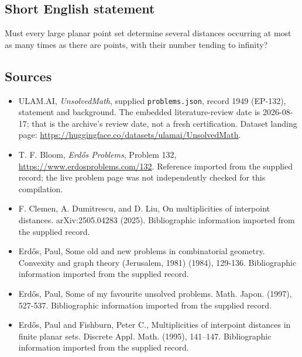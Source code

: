 \documentclass[11pt,a4paper]{article}
\begin{document}
\subsection{Short English statement}

Must every large planar point set determine several distances occurring at most as many times as there are points, with their number tending to infinity?

\subsection{Sources}

{\small

\begin{itemize}

\item[\hypertarget{source:1949:1}{S1}] ULAM.AI, \emph{UnsolvedMath}, supplied \texttt{problems.json}, record 1949 (EP-132), statement and background. The embedded literature-review date is 2026-08-17; that is the archive’s review date, not a fresh certification. Dataset landing page: \url{https://huggingface.co/datasets/ulamai/UnsolvedMath}.

\item[\hypertarget{source:1949:2}{S2}] T. F. Bloom, \emph{Erdős Problems}, Problem 132, \url{https://www.erdosproblems.com/132}. Reference imported from the supplied record; the live problem page was not independently checked for this compilation.

\item[\hypertarget{source:1949:3}{S3}] F. Clemen, A. Dumitrescu, and D. Liu, On multiplicities of interpoint distances. arXiv:2505.04283 (2025). Bibliographic information imported from the supplied record.

\item[\hypertarget{source:1949:4}{S4}] Erd\H{o}s, Paul, Some old and new problems in combinatorial geometry. Convexity and graph theory (Jerusalem, 1981) (1984), 129-136. Bibliographic information imported from the supplied record.

\item[\hypertarget{source:1949:5}{S5}] Erd\H{o}s, Paul, Some of my favourite unsolved problems. Math. Japon. (1997), 527-537. Bibliographic information imported from the supplied record.

\item[\hypertarget{source:1949:6}{S6}] Erd\H{o}s, Paul and Fishburn, Peter C., Multiplicities of interpoint distances in finite planar sets. Discrete Appl. Math. (1995), 141--147. Bibliographic information imported from the supplied record.

\end{itemize}

}

\label{end:1949}
\end{document}
